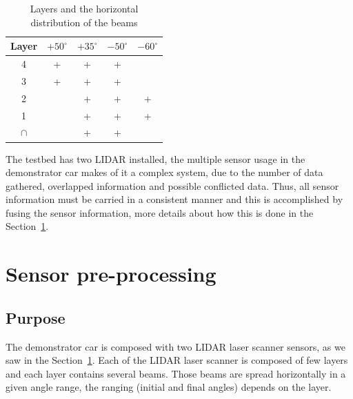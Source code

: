 \begin{table}
\label{tab:beam:interception}
	\begin{center}
	    \begin{tabular}{ | c | c | c | c | c |}
		    \hline
		    Layer & $+50^\circ$ & $+35^\circ$ & $-50^\circ$ & $-60^\circ$ \\ \hline
		    4 & + & + & + &  \\ \hline
		    3 & + & + & + &  \\ \hline
		    2 &  & + & + & + \\ \hline
		    1 &  & + & + & + \\ \hline
		    $\cap$ &  & + & + &  \\ \hline
	    \end{tabular}
	\end{center}
    \caption{Layers and the horizontal distribution of the beams}
\end{table}

The testbed has two LIDAR installed, the multiple sensor usage in the demonstrator car makes of it a complex system, due to the number of data gathered, overlapped information and possible conflicted data. Thus, all sensor information must be carried in a consistent manner and this is accomplished by fusing the sensor information, more details about how this is done in the Section~\ref{sec:sensor:fusion}.

\section{Sensor pre-processing} %
\label{sec:sensor:fusion}


\subsection{Purpose}

The demonstrator car is composed with two LIDAR laser scanner sensors, as we saw in the Section~\ref{sec:sensor:fusion}. Each of the LIDAR laser scanner is composed of few layers and each layer contains several beams. Those beams are spread horizontally in a given angle range, the ranging (initial and final angles) depends on the layer.

